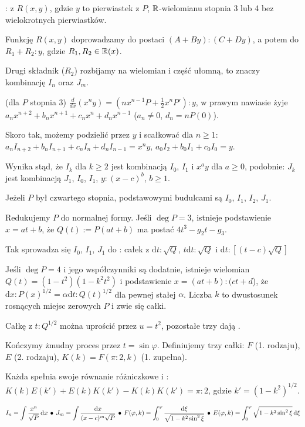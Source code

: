 : z $R(x, y)$, gdzie $y$ to pierwiastek z $P$, $\mathbb{R}$-wielomianu stopnia 3 lub 4 bez wielokrotnych pierwiastków.
\begin{enumx}
\item Funkcję $R(x, y)$ doprowadzamy do postaci $(A + B y) : (C + Dy)$, a potem do $R_1 + R_2 : y$, gdzie $R_1, R_2 \in \mathbb{R}(x)$.
\item Drugi składnik ($R_2$) rozbijamy na wielomian i część ułomną, to znaczy kombinację $I_n$ oraz $J_m$.
\item (dla $P$ stopnia 3) $\frac {d}{dx} (x^ny) = (nx^{n-1} P + \frac 1 2 x^n P') : y$, w prawym nawiasie żyje $a_n x^{n+2} + b_n x^{n+1} + c_nx^n + d_nx^{n-1}$ ($a_n \neq 0$, $d_n = nP(0)$).
\item Skoro tak, możemy podzielić przez $y$ i scałkować dla $n \ge 1$: $a_n I_{n+2} + b_n I_{n+1} + c_n I_n + d_n I_{n-1} = x^n y$, $a_0 I_2 + b_0 I_1 + c_0 I_0 = y$.
\item Wynika stąd, że $I_k$ dla $k \ge 2$ jest kombinacją $I_0$, $I_1$ i $x^a y$ dla $a \ge 0$, podobnie: $J_k$ jest kombinacją $J_1$, $I_0$, $I_1$, $y : (x-c)^b$, $b \ge 1$.
\item Jeżeli $P$ był czwartego stopnia, podstawowymi budulcami są $I_0$, $I_1$, $I_2$, $J_1$.
\item Redukujemy $P$ do normalnej formy. Jeśli $\deg P = 3$, istnieje podstawienie $x = at + b$, że $Q(t) := P(at + b)$ ma postać $4t^3 - g_2 t - g_3$.
\item Tak sprowadza się $I_0$, $I_1$, $J_1$ do : całek z $\textrm{d}t : \sqrt{Q}$, $t \textrm{d}t : \sqrt{Q}$ i $\textrm{d}t : [(t-c)\sqrt{Q}]$
\item Jeśli $\deg P = 4$ i jego współczynniki są dodatnie, istnieje wielomian $Q(t) = (1-t^2)(1 - k^2t^2)$ i podstawienie $x = (at+ b) : (ct + d$), że $\textrm{d}x : P(x)^{1/2} = \alpha \textrm{d}t : Q(t)^{1/2}$ dla pewnej stałej $\alpha$.
Liczba $k$ to dwustosunek rosnących miejsc zerowych $P$ i zwie się  całki.
\item Całkę z $t : Q^{1/2}$ można uprościć przez $u = t^2$, pozostałe trzy dają .
\item Kończymy żmudny proces przez $t = \sin \varphi$. Definiujemy trzy całki: $F$ (1. rodzaju), $E$ (2. rodzaju), $K(k) = F(\pi : 2, k)$ (1. zupełna).
\item Każda spełnia swoje równanie różniczkowe i : $K(k) E(k') + E(k) K(k') - K(k) K(k') = \pi : 2$, gdzie $k' = (1 - k^2)^{1/2}$.
\end{enumx}
\[
	I_n = \int \frac{x^n}{\sqrt{P}} \,\textrm{d}x \, \bullet \,
	J_m = \int \frac{\textrm{d}x}{(x-c)^m \sqrt{P}} \, \bullet \,
	F(\varphi, k) = \int_0^\varphi \frac{\textrm{d}\xi}{\sqrt{1-k^2 \sin^2 \xi}} \, \bullet \,
	E(\varphi, k) = \int_0^\varphi \sqrt{1-k^2 \sin^2 \xi} \,\textrm{d}\xi
\]


